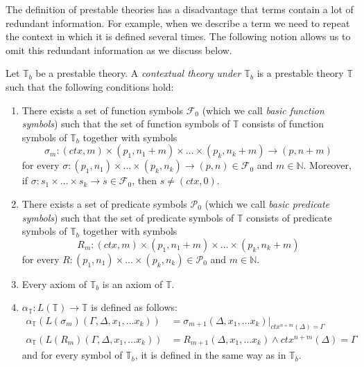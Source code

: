 \documentclass[reqno]{amsart}
\theoremstyle{definition}
\theoremstyle{remark}
\numberwithin{figure}{section}
\begin{document}
The definition of prestable theories has a disadvantage that terms contain a lot of redundant information.
For example, when we describe a term we need to repeat the context in which it is defined several times.
The following notion allows us to omit this redundant information as we discuss below.

\begin{defn}
Let $\mathbb{T}_b$ be a prestable theory.
A \emph{contextual theory under $\mathbb{T}_b$} is a prestable theory $\mathbb{T}$ such that the following conditions hold:
\begin{enumerate}
\item There exists a set of function symbols $\mathcal{F}_0$ (which we call \emph{basic function symbols}) such that
the set of function symbols of $\mathbb{T}$ consists of function symbols of $\mathbb{T}_b$ together with symbols
\[ \sigma_m : (ctx,m) \times (p_1,n_1+m) \times \ldots \times (p_k,n_k+m) \to (p,n+m) \]
for every $\sigma : (p_1,n_1) \times \ldots \times (p_k,n_k) \to (p,n) \in \mathcal{F}_0$ and $m \in \mathbb{N}$.
Moreover, if $\sigma : s_1 \times \ldots \times s_k \to s \in \mathcal{F}_0$, then $s \neq (ctx,0)$.
\item There exists a set of predicate symbols $\mathcal{P}_0$ (which we call \emph{basic predicate symbols}) such that
the set of predicate symbols of $\mathbb{T}$ consists of predicate symbols of $\mathbb{T}_b$ together with symbols
\[ R_m : (ctx,m) \times (p_1,n_1+m) \times \ldots \times (p_k,n_k+m) \]
for every $R : (p_1,n_1) \times \ldots \times (p_k,n_k) \in \mathcal{P}_0$ and $m \in \mathbb{N}$.
\item Every axiom of $\mathbb{T}_b$ is an axiom of $\mathbb{T}$.
\item $\alpha_\mathbb{T} : L(\mathbb{T}) \to \mathbb{T}$ is defined as follows:
\begin{align*}
\alpha_\mathbb{T}(L(\sigma_m)(\Gamma, \Delta, x_1, \ldots x_k)) & = \sigma_{m+1}(\Delta, x_1, \ldots x_k)|_{ctx^{n+m}(\Delta) = \Gamma} \\
\alpha_\mathbb{T}(L(R_m)(\Gamma, \Delta, x_1, \ldots x_k)) & = R_{m+1}(\Delta, x_1, \ldots x_k) \land ctx^{n+m}(\Delta) = \Gamma
\end{align*}
and for every symbol of $\mathbb{T}_b$, it is defined in the same way as in $\mathbb{T}_b$.
\end{enumerate}
\end{defn}
\end{document}
